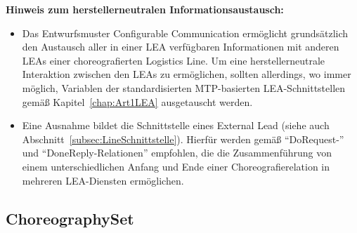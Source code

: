 \begin{grayboxEnumerate}
	\textbf{Hinweis zum herstellerneutralen Informationsaustausch:}
	\begin{itemize}
		\item Das Entwurfsmuster Configurable Communication ermöglicht grundsätzlich den Austausch aller in einer LEA verfügbaren Informationen mit anderen LEAs einer choreografierten Logistics Line. Um eine herstellerneutrale Interaktion zwischen den LEAs zu ermöglichen, sollten allerdings, wo immer möglich, Variablen der standardisierten MTP-basierten LEA-Schnittstellen gemäß Kapitel~\ref{chap:Art1LEA} ausgetauscht werden.
		\item Eine Ausnahme bildet die Schnittstelle eines External Lead (siehe auch Abschnitt~\ref{subsec:LineSchnittstelle}). Hierfür werden gemäß \cite{Stutz.2026} \enquote{DoRequest-} und \enquote{DoneReply-Relationen} empfohlen, die die Zusammenführung von einem unterschiedlichen Anfang und Ende einer Choreografierelation in mehreren LEA-Diensten ermöglichen.
	\end{itemize}
\end{grayboxEnumerate}

\subsection{ChoreographySet}
\label{subsec:ChoreoSet}


